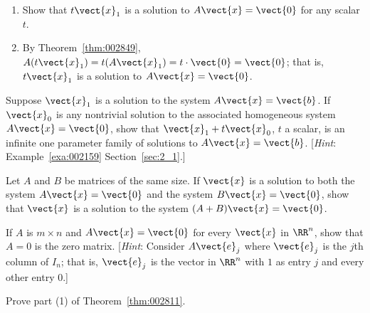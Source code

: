 \begin{multicols}{2}
\begin{ex}
\begin{enumerate}[label={\alph*.}]
\item Show that $t\vect{x}_{1}$ is a solution to $A\vect{x} = \vect{0}$ for any scalar $t$.

\end{enumerate}
\begin{sol}
\begin{enumerate}[label={\alph*.}]
\setcounter{enumi}{1}
\item  By Theorem~\ref{thm:002849}, $A(t\vect{x}_{1}) = t(A\vect{x}_{1}) = t \cdot \vect{0} = \vect{0}$; that is, $t\vect{x}_{1}$ is a solution to $A\vect{x} = \vect{0}$.

\end{enumerate}
\end{sol}
\end{ex}


\begin{ex}
Suppose $\vect{x}_{1}$ is a solution to the system $A\vect{x} = \vect{b}$. If $\vect{x}_{0}$ is any nontrivial solution to the associated homogeneous system $A\vect{x} = \vect{0}$, show that $\vect{x}_{1} + t\vect{x}_{0}$, $t$ a scalar, is an infinite one parameter family of solutions to $A\vect{x} = \vect{b}$. [\textit{Hint}: Example~\ref{exa:002159} Section~\ref{sec:2_1}.]
\end{ex}

\begin{ex}
Let $A$ and $B$ be matrices of the same size. If $\vect{x}$ is a solution to both the system $A\vect{x} = \vect{0}$ and the system $B\vect{x} = \vect{0}$, show that $\vect{x}$ is a solution to the system $(A + B)\vect{x} = \vect{0}$.
\end{ex}

\begin{ex}
If $A$ is $m \times n$ and $A\vect{x} = \vect{0}$ for every $\vect{x}$ in $\RR^n$, show that $A = 0$ is the zero matrix. [\textit{Hint}: Consider $A\vect{e}_{j}$ where $\vect{e}_{j}$ is the $j$th column of $I_{n}$; that is, $\vect{e}_{j}$ is the vector in $\RR^n$ with $1$ as entry $j$ and every other entry $0$.]
\end{ex}

\begin{ex}
Prove part (1) of Theorem~\ref{thm:002811}.


\end{ex}
\end{multicols}
